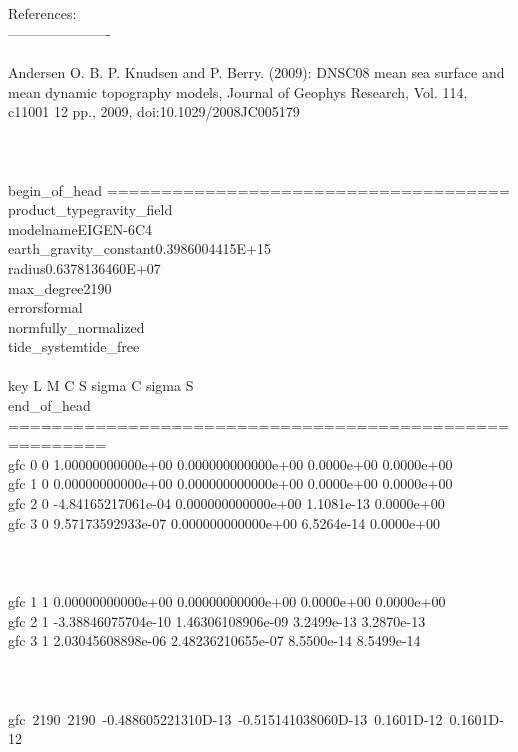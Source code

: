 \documentclass[a4paper,12pt]{book}
\begin{document}
{\\
\\
\noindent References:\\
\noindent ----------------------
\\
\\
\noindent Andersen O. B. P. Knudsen and P. Berry. (2009): DNSC08 mean sea 
surface and mean dynamic topography models, Journal of Geophys Research, 
Vol. 114, c11001 12 pp., 2009, doi:10.1029/2008JC005179
\\
\\
\noindent [...]
\\
\\
\noindent begin\_of\_head =====================================\\
\noindent product\_type\phantom{***************}gravity\_field\\
\noindent modelname\phantom{******************}EIGEN-6C4\\
\noindent earth\_gravity\_constant\phantom{*****}0.3986004415E+15\\
\noindent radius\phantom{*********************}0.6378136460E+07\\
\noindent max\_degree\phantom{*****************}2190\\
\noindent errors\phantom{*********************}formal\\
\noindent norm\phantom{***********************}fully\_normalized\\
\noindent tide\_system\phantom{****************}tide\_free\\
\\
\noindent key    L    M \phantom{-}C \phantom{-------------------------------}S 
\phantom{----------------------------------}sigma C   \phantom{------}sigma S\\
\noindent end\_of\_head 
=======================================================\\
\noindent gfc    0    0  \phantom{-}1.00000000000e+00 0.000000000000e+00 0.0000e+00 0.0000e+00\\
\noindent gfc    1    0  \phantom{-}0.00000000000e+00 0.000000000000e+00 0.0000e+00 0.0000e+00\\
\noindent gfc    2    0 -4.84165217061e-04 0.000000000000e+00 1.1081e-13 0.0000e+00\\
\noindent gfc    3    0  \phantom{-}9.57173592933e-07 0.000000000000e+00 6.5264e-14 0.0000e+00\\
\\
\noindent [...]
\\
\\
\noindent gfc    1    1 \phantom{-}0.00000000000e+00 0.00000000000e+00 0.0000e+00 0.0000e+00\\
\noindent gfc    2    1 -3.38846075704e-10  1.46306108906e-09 3.2499e-13 3.2870e-13\\
\noindent gfc    3    1 \phantom{-}2.03045608898e-06  2.48236210655e-07 
8.5500e-14 8.5499e-14\\
\\
\noindent [...]
\\
\\
\noindent \mbox{gfc 2190 2190 -0.488605221310D-13 -0.515141038060D-13 0.1601D-12 0.1601D-12}
}
\end{document}
